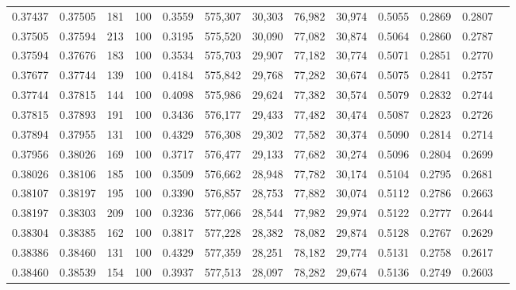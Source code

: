 \begin{tabular}{rrrrrrrrrrrrr}
0.37437 & 0.37505 &   181 & 100 &                                     0.3559 & 575,307 &  30,303 &  76,982 &  30,974 & 0.5055 & 0.2869 & 0.2807 \\
0.37505 & 0.37594 &   213 & 100 &                                     0.3195 & 575,520 &  30,090 &  77,082 &  30,874 & 0.5064 & 0.2860 & 0.2787 \\
0.37594 & 0.37676 &   183 & 100 &                                     0.3534 & 575,703 &  29,907 &  77,182 &  30,774 & 0.5071 & 0.2851 & 0.2770 \\
0.37677 & 0.37744 &   139 & 100 &                                     0.4184 & 575,842 &  29,768 &  77,282 &  30,674 & 0.5075 & 0.2841 & 0.2757 \\
0.37744 & 0.37815 &   144 & 100 &                                     0.4098 & 575,986 &  29,624 &  77,382 &  30,574 & 0.5079 & 0.2832 & 0.2744 \\
0.37815 & 0.37893 &   191 & 100 &                                     0.3436 & 576,177 &  29,433 &  77,482 &  30,474 & 0.5087 & 0.2823 & 0.2726 \\
0.37894 & 0.37955 &   131 & 100 &                                     0.4329 & 576,308 &  29,302 &  77,582 &  30,374 & 0.5090 & 0.2814 & 0.2714 \\
0.37956 & 0.38026 &   169 & 100 &                                     0.3717 & 576,477 &  29,133 &  77,682 &  30,274 & 0.5096 & 0.2804 & 0.2699 \\
0.38026 & 0.38106 &   185 & 100 &                                     0.3509 & 576,662 &  28,948 &  77,782 &  30,174 & 0.5104 & 0.2795 & 0.2681 \\
0.38107 & 0.38197 &   195 & 100 &                                     0.3390 & 576,857 &  28,753 &  77,882 &  30,074 & 0.5112 & 0.2786 & 0.2663 \\
0.38197 & 0.38303 &   209 & 100 &                                     0.3236 & 577,066 &  28,544 &  77,982 &  29,974 & 0.5122 & 0.2777 & 0.2644 \\
0.38304 & 0.38385 &   162 & 100 &                                     0.3817 & 577,228 &  28,382 &  78,082 &  29,874 & 0.5128 & 0.2767 & 0.2629 \\
0.38386 & 0.38460 &   131 & 100 &                                     0.4329 & 577,359 &  28,251 &  78,182 &  29,774 & 0.5131 & 0.2758 & 0.2617 \\
0.38460 & 0.38539 &   154 & 100 &                                     0.3937 & 577,513 &  28,097 &  78,282 &  29,674 & 0.5136 & 0.2749 & 0.2603 \\

\end{tabular}
